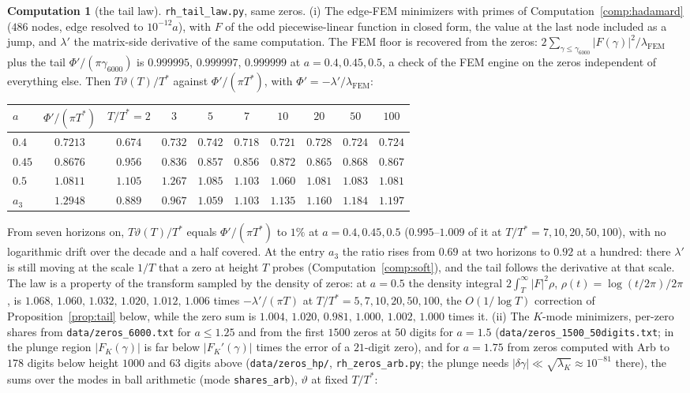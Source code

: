 \documentclass[11pt]{article}
\theoremstyle{definition}
\newtheorem{computation}[theorem]{Computation}
\theoremstyle{remark}
\newcommand{\Tst}{T^{*}}
\begin{document}
\begin{computation}[the tail law]\label{comp:tail}
\texttt{rh\_tail\_law.py}, same zeros. (i) The edge-FEM minimizers with primes of Computation~\ref{comp:hadamard} ($486$ nodes, edge resolved to $10^{-12}a$), with $F$ of the odd piecewise-linear function in closed form, the value at the last node included as a jump, and $\lambda'$ the matrix-side derivative of the same computation. The FEM floor is recovered from the zeros: $2\sum_{\gamma\le\gamma_{6000}}|F(\gamma)|^2/\lambda_{\mathrm{FEM}}$ plus the tail $\Phi'/(\pi\gamma_{6000})$ is $0.999995$, $0.999997$, $0.999999$ at $a=0.4,0.45,0.5$, a check of the FEM engine on the zeros independent of everything else. Then $T\vartheta(T)/\Tst$ against $\Phi'/(\pi\Tst)$, with $\Phi'=-\lambda'/\lambda_{\mathrm{FEM}}$:
\begin{center}\footnotesize
\begin{tabular}{@{}lccccccccc@{}}
\toprule
$a$ & $\Phi'/(\pi\Tst)$ & $T/\Tst=2$ & $3$ & $5$ & $7$ & $10$ & $20$ & $50$ & $100$\\
\midrule
$0.4$ & $0.7213$ & $0.674$ & $0.732$ & $0.742$ & $0.718$ & $0.721$ & $0.728$ & $0.724$ & $0.724$\\
$0.45$ & $0.8676$ & $0.956$ & $0.836$ & $0.857$ & $0.856$ & $0.872$ & $0.865$ & $0.868$ & $0.867$\\
$0.5$ & $1.0811$ & $1.105$ & $1.267$ & $1.085$ & $1.103$ & $1.060$ & $1.081$ & $1.083$ & $1.081$\\
$a_3$ & $1.2948$ & $0.889$ & $0.967$ & $1.059$ & $1.103$ & $1.135$ & $1.160$ & $1.184$ & $1.197$\\
\bottomrule
\end{tabular}
\end{center}
From seven horizons on, $T\vartheta(T)/\Tst$ equals $\Phi'/(\pi\Tst)$ to $1\%$ at $a=0.4,0.45,0.5$ ($0.995$--$1.009$ of it at $T/\Tst=7,10,20,50,100$), with no logarithmic drift over the decade and a half covered. At the entry $a_3$ the ratio rises from $0.69$ at two horizons to $0.92$ at a hundred: there $\lambda'$ is still moving at the scale $1/T$ that a zero at height $T$ probes (Computation~\ref{comp:soft}), and the tail follows the derivative at that scale. The law is a property of the transform sampled by the density of zeros: at $a=0.5$ the density integral $2\int_T^\infty|F|^2\rho$, $\rho(t)=\log(t/2\pi)/2\pi$, is $1.068,\,1.060,\,1.032,\,1.020,\,1.012,\,1.006$ times $-\lambda'/(\pi T)$ at $T/\Tst=5,7,10,20,50,100$, the $O(1/\log T)$ correction of Proposition~\ref{prop:tail} below, while the zero sum is $1.004,\,1.020,\,0.981,\,1.000,\,1.002,\,1.000$ times it. (ii) The $K$-mode minimizers, per-zero shares from \texttt{data/zeros\_6000.txt} for $a\le1.25$ and from the first $1500$ zeros at $50$ digits for $a=1.5$ (\texttt{data/zeros\_1500\_50digits.txt}; in the plunge region $|F_K(\gamma)|$ is far below $|F_K'(\gamma)|$ times the error of a $21$-digit zero), and for $a=1.75$ from zeros computed with Arb to $178$ digits below height $1000$ and $63$ digits above (\texttt{data/zeros\_hp/}, \texttt{rh\_zeros\_arb.py}; the plunge needs $|\delta\gamma|\ll\sqrt{\lambda_K}\approx10^{-81}$ there), the sums over the modes in ball arithmetic (mode \texttt{shares\_arb}), $\vartheta$ at fixed $T/\Tst$:

\end{computation}
\end{document}
